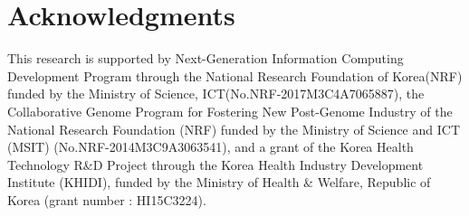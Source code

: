 \documentclass{article}
\begin{document}
\section*{Acknowledgments}

This research is supported by Next-Generation Information Computing Development Program through the National Research Foundation of Korea(NRF) funded by the Ministry of Science, ICT(No.NRF-2017M3C4A7065887),
the Collaborative Genome Program for Fostering New Post-Genome Industry of the National Research Foundation (NRF) funded by the Ministry of Science and ICT (MSIT) (No.NRF-2014M3C9A3063541),
and a grant of the Korea Health Technology R\&D Project through the Korea Health Industry Development Institute (KHIDI), funded by the Ministry of Health \& Welfare, Republic of Korea (grant number : HI15C3224).



\end{document}
